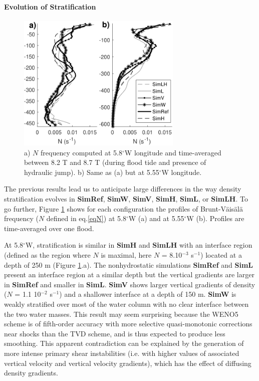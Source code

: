 \paragraph{Evolution of Stratification}

\begin{figure}[!h]
\centering
  \includegraphics[width=0.7\textwidth]{./GBR2D/figure13.png}
  \caption {a) $N$ frequency computed at 5.8$^\circ$W longitude and time-averaged between 8.2 T and 8.7 T (during flood tide and presence of hydraulic jump). b) Same as (a) but at 5.55$^\circ$W longitude.}
	\label{fig_sensnum2}
\end{figure}

The previous results lead us to anticipate large differences in the way density stratification evolves in \textbf{SimRef}, \textbf{SimW}, \textbf{SimV}, \textbf{SimH}, \textbf{SimL}, or \textbf{SimLH}. To go further, Figure \ref{fig_sensnum2} shows for each configuration the profiles of Brunt-V\"ais\"al\"a frequency ($N$ defined in eq.\ref{eqN}) at 5.8$^\circ$W (a) and at 5.55$^\circ$W (b). Profiles are time-averaged over one flood. 

At 5.8$^\circ$W, stratification is similar in \textbf{SimH} and \textbf{SimLH} with an interface region (defined as the region where $N$ is maximal, here $N$ = 8.10$^{-3}$ s$^{-1}$) located at a depth of 250 m (Figure \ref{fig_sensnum2}.a). The nonhydrostatic simulations \textbf{SimRef} and \textbf{SimL} present an interface region at a similar depth but the vertical gradients are larger in \textbf{SimRef} and smaller in \textbf{SimL}.
\textbf{SimV} shows larger vertical gradients of density ($N$ = 1.1 10$^{-2}$ s$^{-1}$) and a shallower interface at a depth of 150 m. \textbf{SimW} is weakly stratified over most of the water column with no clear interface between the two water masses. This result may seem surprising because the WENO5 scheme is of fifth-order accuracy with more selective quasi-monotonic corrections near shocks than the TVD scheme, and is thus expected to produce less smoothing. This apparent contradiction can be explained by the generation of more intense primary shear instabilities (i.e. with higher values of associated vertical velocity and vertical velocity gradients), which has the effect of diffusing density gradients.

